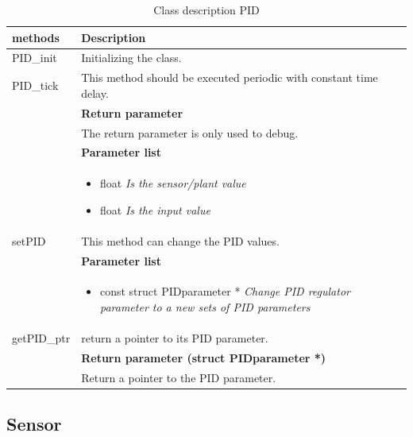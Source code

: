 \begin{table}[H]
	\centering
	\begin{tabular}{|p{5 cm}|p{10 cm}|}
		\hline
		\textbf{methods} & \textbf{Description} \\ \hline
		
		PID\_init
		& Initializing the class. 
		\\ \hline
		
		PID\_tick
		& This method should be executed periodic with constant time delay. 
		\\ & \textbf{Return parameter}
		\\ & The return parameter is only used to debug.
		\\ & \textbf{Parameter list}
		\\ & \begin{itemize}
			\item {\large float}
			\subitem \textit{Is the sensor/plant value}
			\item {\large float}
			\subitem \textit{Is the input value}
		\end{itemize}
		\\ \hline
		
		setPID
		& This method can change the PID values.
		\\ & \textbf{Parameter list}
		\\ & \begin{itemize}
			\item {\large const struct PIDparameter *}
			\subitem \textit{Change PID regulator parameter to a new sets of PID parameters}
		\end{itemize} 
		\\ \hline
		
		getPID\_ptr
		& return a pointer to its PID parameter.
		\\ & \textbf{Return parameter (struct PIDparameter *)}
		\\ & Return a pointer to the PID parameter. 
		\\ \hline
		
	\end{tabular}
	\caption{Class description PID}
	\label{table:Class_description_PID_RR_PSoC}
\end{table}

\subsection{Sensor}

